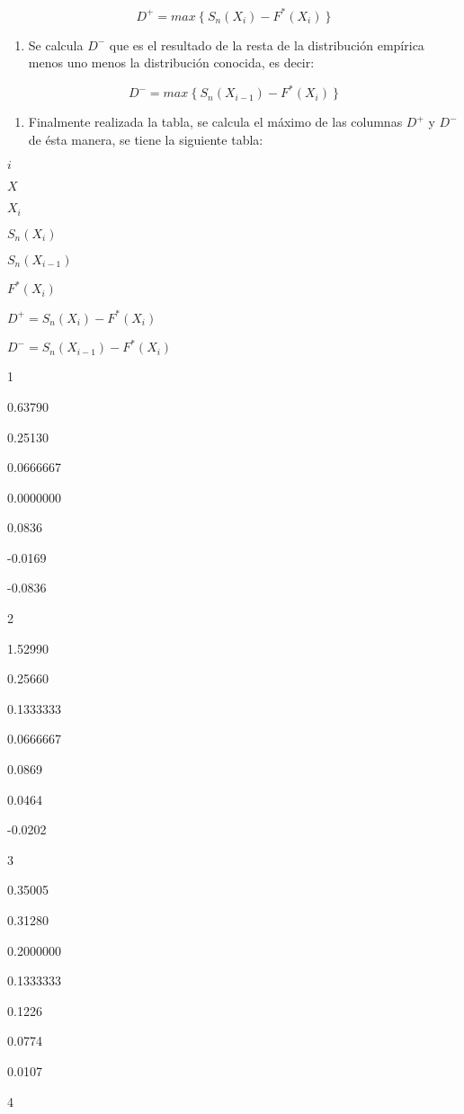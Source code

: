\documentclass[
  a4paper,
  oneside,
  openany]{book}
\providecommand{\tightlist}{%
  \setlength{\itemsep}{0pt}\setlength{\parskip}{0pt}}
\begin{document}
\[D^+= max \ \{\ S_{n}(X_{i})-F^*(X_{i}) \ \}\]

\begin{enumerate}
\def\labelenumi{\arabic{enumi})}
\setcounter{enumi}{5}
\tightlist
\item
  Se calcula \(D^-\) que es el resultado de la resta de la distribución empírica menos uno menos la distribución conocida, es decir:
\end{enumerate}

\[D^-= max \ \{\ S_{n}(X_{i-1})-F^*(X_{i}) \ \}\]

\begin{enumerate}
\def\labelenumi{\arabic{enumi})}
\setcounter{enumi}{6}
\tightlist
\item
  Finalmente realizada la tabla, se calcula el máximo de las columnas \(D^+\) y \(D^-\) de ésta manera, se tiene la siguiente tabla:
\end{enumerate}

\(i\)

\(X\)

\(X_i\)

\(S_n(X_i)\)

\(S_n(X_{i-1})\)

\(F^*(X_i)\)

\(D^+=S_n(X_i)-F^*(X_i)\)

\(D^-=S_n(X_{i-1})-F^*(X_i)\)

1

0.63790

0.25130

0.0666667

0.0000000

0.0836

-0.0169

-0.0836

2

1.52990

0.25660

0.1333333

0.0666667

0.0869

0.0464

-0.0202

3

0.35005

0.31280

0.2000000

0.1333333

0.1226

0.0774

0.0107

4
\end{document}
